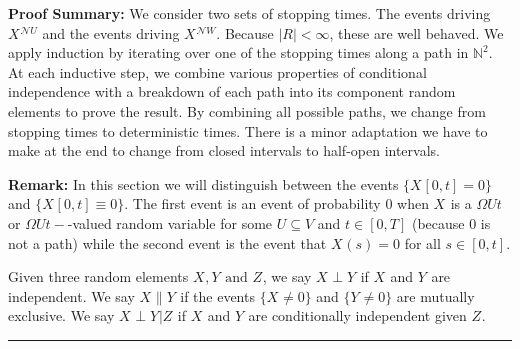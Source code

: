 \documentclass[12pt]{article}
\newcommand{\skipLine}{\vspace{12pt}}
\newcommand{\mb}{\mathbb}
\newcommand{\mc}{\mathcal}
\newcommand{\te}{\text}
\newcommand{\pfsum}{\textbf{Proof Summary: }}
\newcommand{\ind}{\hspace{24pt}}
\newcommand{\lin}{\rule{\linewidth}{0.4 pt}}
\newcommand{\neigh}{\mc{N}}					%
\renewcommand{\U}{U}							%
\newcommand{\UU}{W}								%
\newcommand{\UUU}{R}							%
\newcommand{\T}{T}								%
\renewcommand{\t}{t}							%
\newcommand{\V}{V}									%
\renewcommand{\tt}{s}								%
\newcommand{\rxvt}[2]{X_{#1}{(#2)}}					%
\newcommand{\rxvts}[2]{X_{#1}{#2}}					%
\newcommand{\rxvtts}[2]{Y_{#1}{#2}}					%
\newcommand{\rxvttts}[2]{Z_{#1}{#2}}				%
\newcommand{\mutex}{\|}								%
\begin{document}
\pfsum We consider two sets of stopping times. The events driving \(\rxvts{}{}^{\neigh{\U}}\) and the events driving \(\rxvts{}{}^{\neigh{\UU}}\). Because \(|\UUU| < \infty\), these are well behaved. We apply induction by iterating over one of the stopping times along a path in \(\mb{N}^2\). At each inductive step, we combine various properties of conditional independence with a breakdown of each path into its component random elements to prove the result. By combining all possible paths, we change from stopping times to deterministic times. There is a minor adaptation we have to make at the end to change from closed intervals to half-open intervals.

\skipLine

\textbf{Remark:} In this section we will distinguish between the events \(\{\rxvts{}{[0,\t]} = 0\}\) and \(\{\rxvts{}{[0,\t]}\equiv 0\}\). The first event is an event of probability 0 when \(\rxvts{}{}\) is a \(\Omega{\U}{\t}\) or \(\Omega{\U}{\t-}\)-valued random variable for some \(\U\subseteq \V\) and \(\t \in [0,\T]\) (because 0 is not a path) while the second event is the event that \(\rxvt{}{\tt} = 0\) for all \(\tt \in [0,\t]\).

\ind Given three random elements \(\rxvts{}{},\rxvtts{}{} \te{ and } \rxvttts{}{}\), we say \(\rxvts{}{}\perp \rxvtts{}{}\) if \(\rxvts{}{}\) and \(\rxvtts{}{}\) are independent. We say \(\rxvts{}{}\mutex \rxvtts{}{}\) if the events \(\{\rxvts{}{}\neq 0\}\) and \(\{\rxvtts{}{} \neq 0\}\) are mutually exclusive. We say \(\rxvts{}{}\perp \rxvtts{}{}|\rxvttts{}{}\) if \(\rxvts{}{}\) and \(\rxvtts{}{}\) are conditionally independent given \(\rxvttts{}{}\).

\lin
\end{document}
